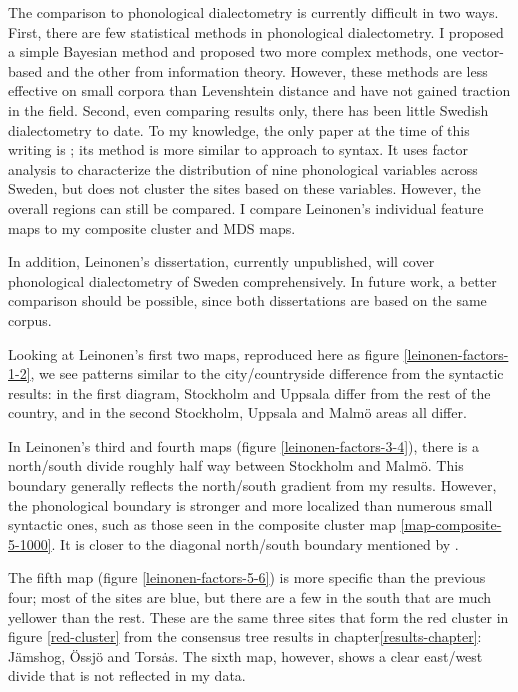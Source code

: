 The comparison to phonological dialectometry is currently difficult in
two ways. First, there are few statistical methods in phonological
dialectometry. I proposed a simple Bayesian method \cite{sanders06}
and  proposed two more complex methods, one
vector-based and the other from information theory. However, these
methods are less effective on small corpora than Levenshtein distance
and have not gained traction in the field.  Second, even comparing
results only, there has been little Swedish dialectometry to date. To
my knowledge, the only paper at the time of this writing is
; its method is more similar to
 approach to syntax. It uses factor analysis to
characterize the distribution of nine phonological variables across
Sweden, but does not cluster the sites based on these
variables. However, the overall regions can still be compared. I
compare Leinonen's individual feature maps to my composite cluster and
MDS maps.

In addition, Leinonen's dissertation, currently unpublished, will
cover phonological dialectometry of Sweden comprehensively. In future
work, a better comparison should be possible, since both dissertations
are based on the same corpus.

Looking at Leinonen's first two maps, reproduced here as figure
\ref{leinonen-factors-1-2}, we see patterns similar to the
city/countryside difference from the syntactic results: in the first diagram,
Stockholm and Uppsala differ from the rest of the country, and in the
second Stockholm, Uppsala and Malm\"o areas all differ.

In Leinonen's third and fourth maps (figure \ref{leinonen-factors-3-4}),
there is a north/south divide roughly half way between Stockholm and
Malm\"o. This boundary generally reflects the north/south
gradient from my results. However, the phonological boundary is stronger and more
localized than numerous small syntactic ones, such as those seen in
the composite cluster map \ref{map-composite-5-1000}. It is closer to
the diagonal north/south boundary mentioned by .

The fifth map (figure \ref{leinonen-factors-5-6}) is more specific
than the previous four; most of the sites are blue, but there are a
few in the south that are much yellower than the rest. These are the
same three sites that form the red cluster in figure \ref{red-cluster}
from the consensus tree results in chapter\ref{results-chapter}:
J\"amshog, \"Ossj\"o and Tors\.as. The sixth map, however, shows a
clear east/west divide that is not reflected in my data.

